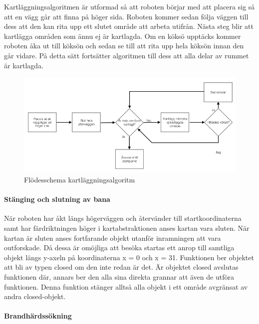 \documentclass[a4paper,12pt,fleqn]{article}
\begin{document}
Kartläggningsalgoritmen är utformad så att roboten börjar med att placera sig så att en vägg går att finna på höger sida. Roboten kommer sedan följa väggen till dess att den kan rita upp ett slutet område att arbeta utifrån. Nästa steg blir att kartlägga områden som ännu ej är kartlagda. Om en köksö upptäcks kommer roboten åka ut till köksön och sedan se till att rita upp hela köksön innan den går vidare. På detta sätt fortsätter algoritmen till dess att alla delar av rummet är kartlagda. 

\begin{figure}[htp] %
  \begin{center}
  \includegraphics[keepaspectratio=true,width=0.8\linewidth]{bilder/Flode_kartritning.jpg}  %
  \end{center}
  \caption{Flödesschema kartläggningsalgoritm} %
  \label{fig:map} %
\end{figure}

\paragraph{Stänging och slutning av bana}
När roboten har åkt längs högerväggen och återvänder till startkoordinaterna samt har färdriktningen höger i kartabstraktionen anses kartan vara sluten. När kartan är sluten anses fortfarande objekt utanför inramningen att vara outforskade. Då dessa är omöjliga att besöka startas ett anrop till samtliga objekt längs y-axeln på koordinaterna x = 0 och x = 31. Funktionen ber objektet att bli av typen closed om den inte redan är det. Är objektet closed avslutas funktionen där, annars ber den alla sina direkta grannar att även de utföra funktionen. Denna funktion stänger alltså alla objekt i ett område avgränsat av andra closed-objekt.

\newpage

\paragraph{Brandhärdssökning}
\end{document}
